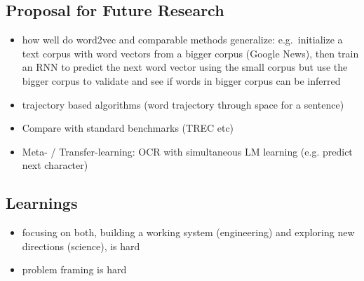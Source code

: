 \subsection{Proposal for Future Research}
\label{sub:further-research}

\begin{itemize}
  \item how well do word2vec and comparable methods generalize: e.g.\ initialize a text corpus with word vectors from a bigger corpus (Google News), then train an RNN to predict the next word vector using the small corpus but use the bigger corpus to validate and see if words in bigger corpus can be inferred
  \item trajectory based algorithms (word trajectory through space for a sentence)
  \item Compare with standard benchmarks (TREC etc)
  \item Meta- / Transfer-learning: OCR with simultaneous LM learning (e.g. predict next character)
\end{itemize}


\subsection{Learnings}
\label{sub:learnings}

\begin{itemize}
  \item focusing on both, building a working system (engineering) and exploring new directions (science), is hard
  \item problem framing is hard
\end{itemize}
